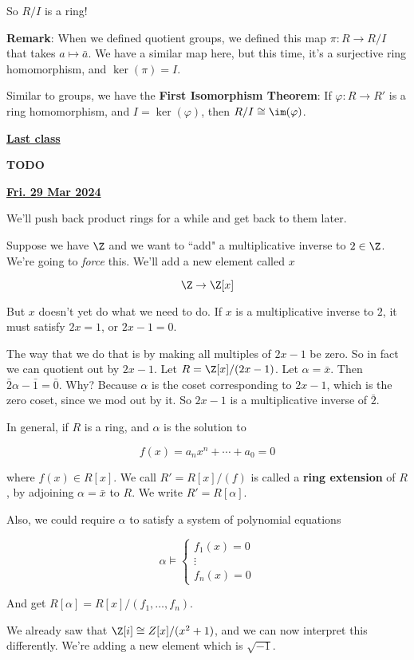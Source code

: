 \documentclass[12pt]{article}
\renewcommand{\date}[1]{\underline{\bf #1}}
\newcommand{\TODO}{\color{red}\textbf{TODO}\color{black}}
\begin{document}
So $R / I$ is a ring!

{\bf Remark}: When we defined quotient groups, we defined this map $\pi: R \to R
/ I$ that takes $a \mapsto \bar a$. We have a similar map here, but this time,
it's a surjective ring homomorphism, and $\ker(\pi) = I$.

Similar to groups, we have the {\bf First Isomorphism Theorem}: If $\varphi: R
\to R'$ is a ring homomorphism, and $I = \ker(\varphi)$, then $R / I \cong
\im(\varphi)$.

\date{Last class}

\TODO{}

\date{Fri. 29 Mar 2024}

We'll push back product rings for a while and get back to them later.

Suppose we have $\Z$ and we want to ``add" a multiplicative inverse to $2 \in
\Z$. We're going to {\it force} this. We'll add a new element called $x$

\[
  \Z \to \Z[x]
\]

But $x$ doesn't yet do what we need to do. If $x$ is a multiplicative inverse to
$2$, it must satisfy $2x = 1$, or $2x - 1 = 0$.

The way that we do that is by making all multiples of $2x - 1$ be zero. So in
fact we can quotient out by $2x - 1$. Let $R = \Z[x] / (2x - 1)$. Let $\alpha =
\bar x$. Then $\bar 2 \alpha - \bar 1 = \bar 0$. Why? Because $\alpha$ is the
coset corresponding to $2x - 1$, which is the zero coset, since we mod out by
it. So $2x - 1$ is a multiplicative inverse of $\bar 2$.

In general, if $R$ is a ring, and $\alpha$ is the solution to 

\[
  f(x) = a_n x^n + \cdots + a_0 = 0
\]

where $f(x) \in R[x]$. We call $R' = R[x] / (f)$ is called a {\bf ring
extension} of $R$, by adjoining $\alpha = \bar x$ to $R$. We write $R' =
R[\alpha]$.

Also, we could require $\alpha$ to satisfy a system of polynomial equations

\[
  \alpha \models \begin{cases*}
    f_1(x) = 0 \\
    \vdots \\
    f_n(x) = 0
  \end{cases*}
\]

And get $R[\alpha] = R[x] / (f_1, \dots, f_n)$.

We already saw that $\Z[i] \cong Z[x] / (x^2 + 1)$, and we can now interpret
this differently. We're adding a new element which is $\sqrt{-1}$.
\end{document}
